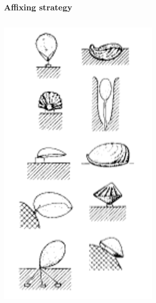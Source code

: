 \documentclass{beamer}
\begin{document}
\begin{frame}
  \frametitle{Affixing strategy}

  \begin{columns}
    \begin{column}{0.5\textwidth}
      \begin{center}
        \includegraphics[height = 0.7\textheight, width = \textwidth, keepaspectratio = true]{figure/methods}


\end{center}
\end{column}
\end{columns}
\end{frame}
\end{document}
